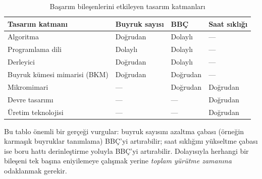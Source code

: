 \begin{table}[H]
\centering
\caption{Başarım bileşenlerini etkileyen tasarım katmanları}
\label{tab:basarim-etki}
\small
\begin{tabular}{lp{3.2cm}p{3.2cm}p{3.2cm}}
\toprule
\textbf{Tasarım katmanı} & \textbf{Buyruk sayısı} & \textbf{BBÇ} & \textbf{Saat sıklığı} \\
\midrule
Algoritma      & Doğrudan   & Dolaylı    & ---         \\
Programlama dili & Dolaylı & Dolaylı    & ---         \\
Derleyici      & Doğrudan   & Dolaylı    & ---         \\
Buyruk kümesi mimarisi (BKM) & Doğrudan & Doğrudan & ---         \\
Mikromimari    & ---        & Doğrudan   & Doğrudan    \\
Devre tasarımı & ---        & ---        & Doğrudan    \\
Üretim teknolojisi & ---   & ---        & Doğrudan    \\
\bottomrule
\end{tabular}
\end{table}

\noindent Bu tablo önemli bir gerçeği vurgular: buyruk sayısını azaltma çabası (örneğin karmaşık buyruklar tanımlama) BBÇ'yi artırabilir; saat sıklığını yükseltme çabası ise boru hattı derinleştirme yoluyla BBÇ'yi artırabilir. Dolayısıyla herhangi bir bileşeni tek başına eniyilemeye çalışmak yerine \emph{toplam yürütme zamanına} odaklanmak gerekir.

